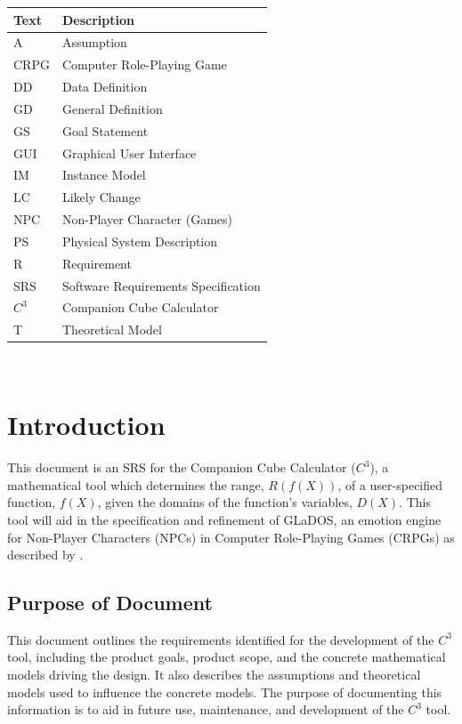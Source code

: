 \documentclass[12pt]{article}
\newcommand{\progname}{Companion Cube Calculator} %
\newcommand{\prognameAbbrv}{$C^{3}$}
\begin{document}
\renewcommand{\arraystretch}{1.2}
\begin{tabular}{l l} 
  \toprule		
  \textbf{Text} & \textbf{Description}\\
  \midrule 
  A & Assumption\\
  CRPG & Computer Role-Playing Game\\
  DD & Data Definition\\
  GD & General Definition\\
  GS & Goal Statement\\
  GUI & Graphical User Interface\\
  IM & Instance Model\\
  LC & Likely Change\\
  NPC & Non-Player Character (Games)\\
  PS & Physical System Description\\
  R & Requirement\\
  SRS & Software Requirements Specification\\
  \prognameAbbrv{} & \progname{}\\
  T & Theoretical Model\\
  \bottomrule
\end{tabular}

\newpage

\tableofcontents

~\newpage


\section{Introduction}
\label{intro}
This document is an SRS for the \progname{} (\prognameAbbrv{}), a mathematical 
tool which determines the range, $R(f(X))$, of a user-specified function, 
$f(X)$, given the domains of the function's variables, $D(X)$. This tool will 
aid in the specification and refinement of GLaDOS, an emotion engine for 
Non-Player Characters (NPCs) in Computer Role-Playing Games (CRPGs) as 
described by \citet{glados}.

\subsection{Purpose of Document}
This document outlines the requirements identified for the development of the 
\prognameAbbrv{} tool, including the product goals, product scope, and the 
concrete mathematical models driving the design. It also describes the 
assumptions and theoretical models used to influence the concrete models. The 
purpose of documenting this information is to aid in future use, maintenance, 
and development of the \prognameAbbrv{} tool.
\end{document}

